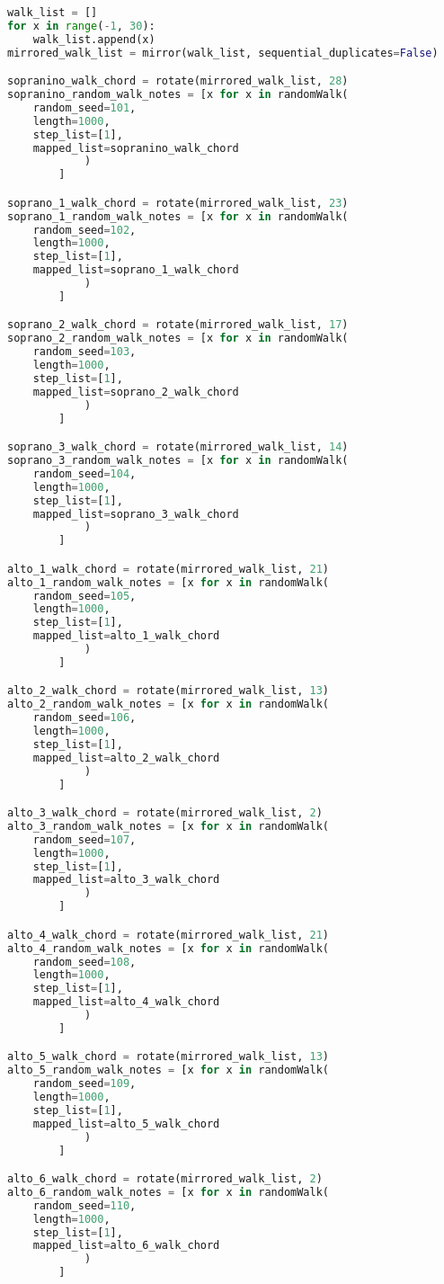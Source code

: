 \begin{lstlisting}[language=Python, caption=Invocation Source Code]
walk_list = []
for x in range(-1, 30):
    walk_list.append(x)
mirrored_walk_list = mirror(walk_list, sequential_duplicates=False)

sopranino_walk_chord = rotate(mirrored_walk_list, 28)
sopranino_random_walk_notes = [x for x in randomWalk(
    random_seed=101,
    length=1000,
    step_list=[1],
    mapped_list=sopranino_walk_chord
            )
        ]

soprano_1_walk_chord = rotate(mirrored_walk_list, 23)
soprano_1_random_walk_notes = [x for x in randomWalk(
    random_seed=102,
    length=1000,
    step_list=[1],
    mapped_list=soprano_1_walk_chord
            )
        ]

soprano_2_walk_chord = rotate(mirrored_walk_list, 17)
soprano_2_random_walk_notes = [x for x in randomWalk(
    random_seed=103,
    length=1000,
    step_list=[1],
    mapped_list=soprano_2_walk_chord
            )
        ]

soprano_3_walk_chord = rotate(mirrored_walk_list, 14)
soprano_3_random_walk_notes = [x for x in randomWalk(
    random_seed=104,
    length=1000,
    step_list=[1],
    mapped_list=soprano_3_walk_chord
            )
        ]

alto_1_walk_chord = rotate(mirrored_walk_list, 21)
alto_1_random_walk_notes = [x for x in randomWalk(
    random_seed=105,
    length=1000,
    step_list=[1],
    mapped_list=alto_1_walk_chord
            )
        ]

alto_2_walk_chord = rotate(mirrored_walk_list, 13)
alto_2_random_walk_notes = [x for x in randomWalk(
    random_seed=106,
    length=1000,
    step_list=[1],
    mapped_list=alto_2_walk_chord
            )
        ]

alto_3_walk_chord = rotate(mirrored_walk_list, 2)
alto_3_random_walk_notes = [x for x in randomWalk(
    random_seed=107,
    length=1000,
    step_list=[1],
    mapped_list=alto_3_walk_chord
            )
        ]

alto_4_walk_chord = rotate(mirrored_walk_list, 21)
alto_4_random_walk_notes = [x for x in randomWalk(
    random_seed=108,
    length=1000,
    step_list=[1],
    mapped_list=alto_4_walk_chord
            )
        ]

alto_5_walk_chord = rotate(mirrored_walk_list, 13)
alto_5_random_walk_notes = [x for x in randomWalk(
    random_seed=109,
    length=1000,
    step_list=[1],
    mapped_list=alto_5_walk_chord
            )
        ]

alto_6_walk_chord = rotate(mirrored_walk_list, 2)
alto_6_random_walk_notes = [x for x in randomWalk(
    random_seed=110,
    length=1000,
    step_list=[1],
    mapped_list=alto_6_walk_chord
            )
        ]


\end{lstlisting}
